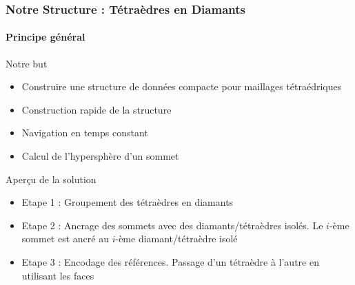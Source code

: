 \documentclass[9pt]{beamer}
\begin{document}
\begin{frame}
\small
\frametitle{Notre Structure : Tétraèdres en Diamants}
\framesubtitle{Principe général}
\small
\begin{block}{Notre but}
\begin{itemize}
\item Construire une structure de données compacte pour maillages tétraédriques
\item Construction rapide de la structure
\item Navigation en temps constant
\item Calcul de l'hypersphère d'un sommet
\end{itemize}
\end{block}
\begin{block}{Aper\c cu de la solution}
\begin{itemize}
\item Etape 1 : Groupement des tétraèdres en diamants %
\item Etape 2 : Ancrage des sommets avec des diamants/tétraèdres isolés. Le $i$-ème sommet est ancré au $i$-ème diamant/tétraèdre isolé %
\item Etape 3 : Encodage des références. Passage d'un tétraèdre à l'autre en utilisant les faces %
\end{itemize}
\end{block}
\end{frame}
\end{document}
